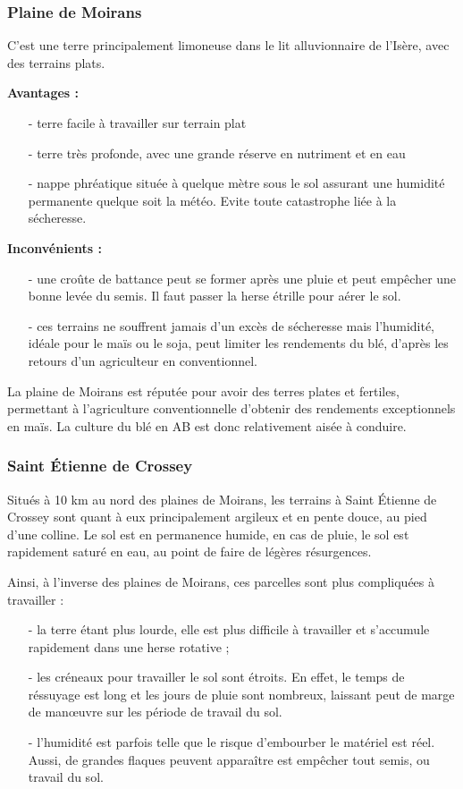 \documentclass{article}
\begin{document}
\subsubsection{Plaine de Moirans} 

C'est une terre principalement limoneuse dans le lit alluvionnaire de l'Isère, avec des terrains plats. 

\textbf{Avantages :}
\begin{itemize}
	\item[-] terre facile à travailler sur terrain plat
	\item[-] terre très profonde, avec une grande réserve en nutriment et en eau
	\item[-] nappe phréatique située à quelque mètre sous le sol assurant une humidité permanente quelque soit la météo. Evite toute catastrophe liée à la sécheresse.
\end{itemize}

\textbf{Inconvénients : }
\begin{itemize}
	\item[-] une croûte de battance peut se former après une pluie et peut empêcher une bonne levée du semis. Il faut passer la herse étrille pour aérer le sol.
	\item[-] ces terrains ne souffrent jamais d'un excès de sécheresse mais l'humidité, idéale pour le maïs ou le soja, peut limiter les rendements du blé, d'après les retours d'un agriculteur en conventionnel. 
\end{itemize}

La plaine de Moirans est réputée pour avoir des terres plates et fertiles, permettant à l'agriculture conventionnelle d'obtenir des rendements exceptionnels en maïs. La culture du blé en AB est donc relativement aisée à conduire. 

\subsubsection{Saint Étienne de Crossey} 

Situés à 10 km au nord des plaines de Moirans, les terrains à Saint Étienne de Crossey sont quant à eux principalement argileux et en pente douce, au pied d'une colline. Le sol est en permanence humide, en cas de pluie, le sol est rapidement saturé en eau, au point de faire de légères résurgences.

Ainsi, à l'inverse des plaines de Moirans, ces parcelles sont plus compliquées à travailler : 
\begin{itemize}
	\item[- ] la terre étant plus lourde, elle est plus difficile à travailler et s'accumule rapidement dans une herse rotative ;
	\item[- ] les créneaux pour travailler le sol sont étroits. En effet, le temps de réssuyage est long et les jours de pluie sont nombreux, laissant peut de marge de manœuvre sur les période de travail du sol. 
	\item[- ] l'humidité est parfois telle que le risque d'embourber le matériel est réel. Aussi, de grandes flaques peuvent apparaître est empêcher tout semis, ou travail du sol.
\end{itemize}
\end{document}
